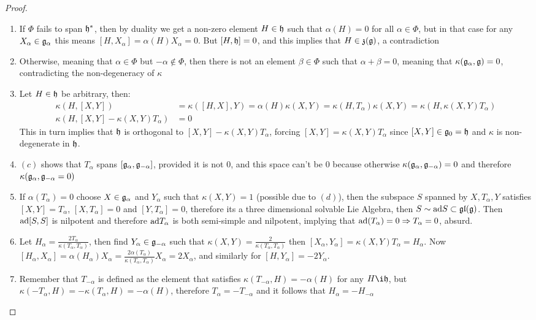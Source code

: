 \begin{proof}
	\begin{enumerate}[label=(\alph*)]
		\item If $\Phi$ fails to span $\mathfrak{h}^*$, then by duality we get a non-zero element $H \in \mathfrak{h}$ such that $\alpha(H)=0$ for all $\alpha \in \Phi$, but in that case for any $X_\alpha \in \mathfrak{g}_\alpha$ this means $[H,X_\alpha]=\alpha(H)X_\alpha =0$.
		But $[H,\mathfrak{h}]=0$, and this implies that $H \in \mathfrak{z}(\mathfrak{g})$, a contradiction
		\item Otherwise, meaning that $\alpha \in \Phi$ but $-\alpha \not \in \Phi$, then there is not an element $\beta \in \Phi$ such that $\alpha + \beta = 0$, meaning that $\kappa(\mathfrak{g}_\alpha,\mathfrak{g})=0$, contradicting the non-degeneracy of $\kappa$
		\item Let $H \in \mathfrak{h}$ be arbitrary, then:
		\begin{align*}
		\kappa(H,[X,Y]) &= \kappa([H,X],Y) = \alpha(H)\kappa(X,Y)=\kappa(H,T_\alpha)\kappa(X,Y)=\kappa(H,\kappa(X,Y)T_\alpha)\\
		\kappa(H,[X,Y]-\kappa(X,Y)T_\alpha)&=0
		\end{align*}
		This in turn implies that $\mathfrak{h}$ is orthogonal to $[X,Y]-\kappa(X,Y)T_\alpha$, forcing $[X,Y]=\kappa(X,Y)T_\alpha$ since $[X,Y] \in \mathfrak{g}_0 = \mathfrak{h}$ and $\kappa$ is non-degenerate in $\mathfrak{h}$.
		\item $(c)$ shows that $T_\alpha$ spans $[\mathfrak{g}_\alpha,\mathfrak{g}_{-\alpha}]$, provided it is not $0$, and this space can't be $0$ because otherwise $\kappa(\mathfrak{g}_\alpha,\mathfrak{g}_{-\alpha})=0$ and therefore $\kappa(\mathfrak{g}_\alpha,\mathfrak{g}_{-\alpha}=0)$
		\item If $\alpha(T_\alpha)=0$ choose $X \in \mathfrak{g}_\alpha$ and $Y_\alpha$ such that $\kappa(X,Y)=1$ (possible due to $(d)$), then the subspace $S$ spanned by ${X,T_\alpha,Y}$ satisfies $[X,Y]=T_\alpha$, $[X,T_\alpha]=0$ and $[Y,T_\alpha]=0$, therefore its a three dimensional solvable Lie Algebra, then $S \sim \text{ad} S \subset \mathfrak{gl}(\mathfrak{g})$. Then $\text{ad}[S,S]$ is nilpotent and therefore $\text{ad} T_\alpha$ is both semi-simple and nilpotent, implying that $\text{ad}(T_\alpha)=0 \Rightarrow T_\alpha=0$, absurd. 
		\item Let $H_\alpha = \frac{2T_\alpha}{\kappa(T_\alpha,T_\alpha)}$, then find $Y_\alpha \in \mathfrak{g}_{-\alpha}$ such that $\kappa(X,Y) = \frac{2}{\kappa(T_\alpha,T_\alpha)}$ then $[X_\alpha,Y_\alpha] = \kappa(X,Y)T_\alpha = H_\alpha$.
		Now $[H_\alpha,X_\alpha] = \alpha(H_\alpha)X_\alpha = \frac{2\alpha(T_\alpha)}{\kappa(T_\alpha,T_\alpha)}X_\alpha = 2X_\alpha $, and similarly for $[H,Y_\alpha]=-2Y_\alpha$.
		\item Remember that $T_{-\alpha}$ is defined as the element that satisfies $\kappa(T_{-\alpha},H)=-\alpha(H)$ for any $H \i \h$, but $\kappa(-T_\alpha,H)=-\kappa(T_\alpha,H)=-\alpha(H)$, therefore $T_{\alpha}=-T_{-\alpha}$ and it follows that $H_{\alpha}=-H_{-\alpha}$
		\end{enumerate}
	\end{proof}
